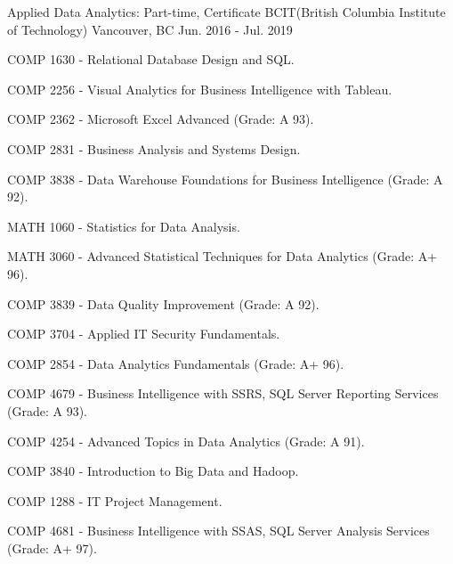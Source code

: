 \documentclass[11pt, a4paper]{awesome-cv}
\begin{document}
\begin{cventries}

  \cventry
    {Applied Data Analytics: Part-time, Certificate} %
    {BCIT(British Columbia Institute of Technology)} %
    {Vancouver, BC} %
    {Jun. 2016 - Jul. 2019} %
    {
      \begin{cvitems} %
        \item {COMP 1630 - Relational Database Design and SQL.}
        \item {COMP 2256 - Visual Analytics for Business Intelligence with Tableau.}
        \item {COMP 2362 - Microsoft Excel Advanced (Grade: A 93).}
        \item {COMP 2831 - Business Analysis and Systems Design.}
        \item {COMP 3838 - Data Warehouse Foundations for Business Intelligence (Grade: A 92).}
        \item {MATH 1060 - Statistics for Data Analysis.}
        \item {MATH 3060 - Advanced Statistical Techniques for Data Analytics (Grade: A+ 96).}
        \item {COMP 3839 - Data Quality Improvement (Grade: A 92).}
        \item {COMP 3704 - Applied IT Security Fundamentals.}
        \item {COMP 2854 - Data Analytics Fundamentals (Grade: A+ 96).}
        \item {COMP 4679 - Business Intelligence with SSRS, SQL Server Reporting Services (Grade: A 93).}
        \item {COMP 4254 - Advanced Topics in Data Analytics (Grade: A 91).}
        \item {COMP 3840 - Introduction to Big Data and Hadoop.}
        \item {COMP 1288 - IT Project Management.}
        \item {COMP 4681 - Business Intelligence with SSAS, SQL Server Analysis Services (Grade: A+ 97).}
      \end{cvitems}
    }

\end{cventries}
\end{document}

